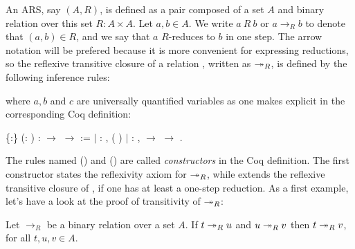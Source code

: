   An ARS, say $(A,R)$, is defined as a pair composed of a set $A$ and
  binary relation over this set $R:A\times A$. Let $a,b\in A$. We
  write $a\ R\ b$ or $a\to_R b$ to denote that $(a,b)\in R$, and we
  say that $a$ $R$-reduces to $b$ in one step. The arrow notation will
  be prefered because it is more convenient for expressing reductions,
  so the reflexive transitive closure of a relation , written as
  $\twoheadrightarrow_R$, is defined by the following inference rules:
   \noindent where $a,b$ and $c$ are universally
  quantified variables as one makes explicit in the corresponding Coq
  definition: \begin{coqdoccode}
\coqdocemptyline
\coqdocnoindent
{}  \{:\} (:  ) :  \ensuremath{\rightarrow}  \ensuremath{\rightarrow}  :=\coqdoceol
\coqdocnoindent
\ensuremath{|} : \coqdockw{\ensuremath{\forall}} , ( )  \coqdoceol
\coqdocnoindent
\ensuremath{|} : \coqdockw{\ensuremath{\forall}}   ,    \ensuremath{\rightarrow}     \ensuremath{\rightarrow}    .\coqdoceol
\coqdocemptyline
\end{coqdoccode}
The rules named () and () are called \textit{constructors}
in the Coq definition. The first constructor states the reflexivity
axiom for $\twoheadrightarrow_R$, while  extends the reflexive transitive
closure of , if one has at least a one-step reduction. As a first
example, let's have a look at the proof of transitivity of $\twoheadrightarrow_R$:


\begin{lemma} Let $\to_R$ be a binary relation over a set $A$. If $t
\twoheadrightarrow_R u$ and $u \twoheadrightarrow_R v$ then $t \twoheadrightarrow_R v$, for all $t,u,v \in A$.
\end{lemma}


